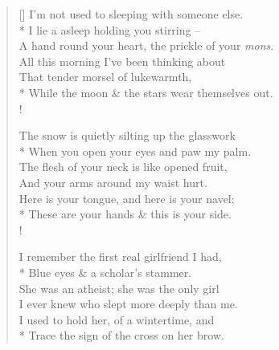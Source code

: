 \settowidth{\versewidth}{I'm not used to sleeping with someone else.}
\begin{verse}[\versewidth]
I'm not used to sleeping with someone else.\\*
\vin I lie a  asleep holding you stirring --\\
A hand round your heart, the prickle of your \emph{mons}.\\
\vin All this morning I've been thinking about\\
That tender morsel of lukewarmth,\\*
\vin While the moon \& the stars wear themselves out.\\!

The snow is quietly silting up the glasswork\\*
\vin When you open your eyes and paw my palm.\\
The flesh of your neck is like opened fruit,\\
\vin And your arms around my waist hurt.\\
Here is your tongue, and here is your navel;\\*
\vin These are your hands \& this is your side.\\!

I remember the first real girlfriend I had,\\*
\vin Blue eyes \& a scholar's stammer.\\
She was an atheist; she was the only girl\\
\vin I ever knew who slept more deeply than me.\\
I used to hold her, of a wintertime, and\\*
\vin Trace the sign of the cross on her brow.
\end{verse}
